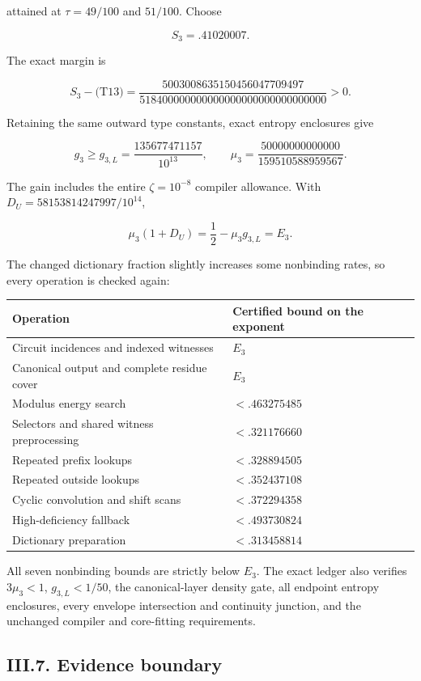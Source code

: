 attained at \(\tau=49/100\) and \(51/100\). Choose

\[
S_3=.41020007.
\]

The exact margin is

\[
S_3-\text{(T13)}
=\frac{5003008635150456047709497}
       {518400000000000000000000000000000}>0.
\tag{T14}
\]

Retaining the same outward type constants, exact entropy enclosures give

\[
g_3\ge g_{3,L}=\frac{135677471157}{10^{13}},\qquad
\mu_3=\frac{50000000000000}{159510588959567}.
\tag{T15}
\]

The gain includes the entire \(\zeta=10^{-8}\) compiler allowance. With \(D_U=58153814247997/10^{14}\),

\[
\mu_3(1+D_U)=\frac12-\mu_3g_{3,L}=E_3.
\tag{T16}
\]

The changed dictionary fraction slightly increases some nonbinding rates, so every operation is checked again:

\begin{longtable}[]{@{}ll@{}}
\toprule\noalign{}
Operation & Certified bound on the exponent \\
\midrule\noalign{}
\endhead
\bottomrule\noalign{}
\endlastfoot
Circuit incidences and indexed witnesses & \(E_3\) \\
Canonical output and complete residue cover & \(E_3\) \\
Modulus energy search & \(<.463275485\) \\
Selectors and shared witness preprocessing & \(<.321176660\) \\
Repeated prefix lookups & \(<.328894505\) \\
Repeated outside lookups & \(<.352437108\) \\
Cyclic convolution and shift scans & \(<.372294358\) \\
High-deficiency fallback & \(<.493730824\) \\
Dictionary preparation & \(<.313458814\) \\
\end{longtable}

All seven nonbinding bounds are strictly below \(E_3\). The exact ledger also verifies \(3\mu_3<1\), \(g_{3,L}<1/50\), the canonical-layer density gate, all endpoint entropy enclosures, every envelope intersection and continuity junction, and the unchanged compiler and core-fitting requirements.

\hypertarget{af-a9ec399514-iii.7.-evidence-boundary}{%
\subsection{III.7. Evidence boundary}\label{af-a9ec399514-iii.7.-evidence-boundary}}

